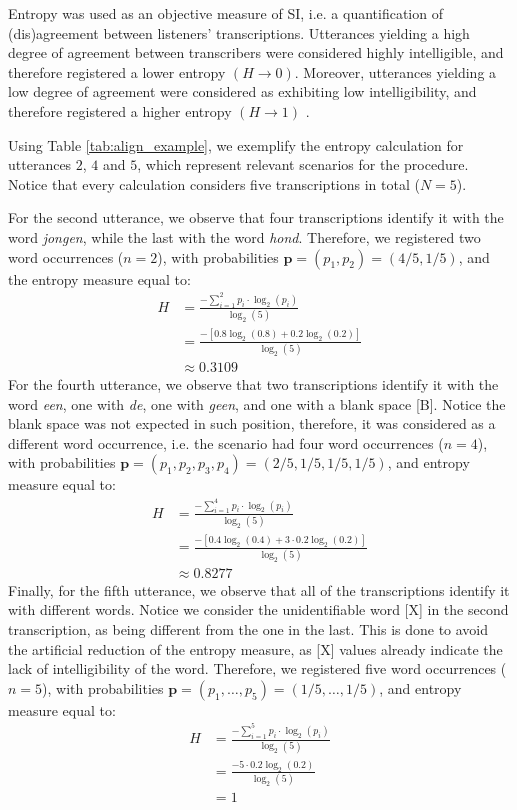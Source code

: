 Entropy was used as an objective measure of SI, i.e. a quantification of (dis)agreement between listeners' transcriptions. Utterances yielding a high degree of agreement between transcribers were considered highly intelligible, and therefore registered a lower entropy $\left( H \rightarrow 0 \right)$. Moreover, utterances yielding a low degree of agreement were considered as exhibiting low intelligibility, and therefore registered a higher entropy $\left( H \rightarrow 1 \right)$ \citep{Boonen_et_al_2021, Faes_et_al_2021}. 

Using Table \ref{tab:align_example}, we exemplify the entropy calculation for utterances $2$, $4$ and $5$, which represent relevant scenarios for the procedure. Notice that every calculation considers five transcriptions in total ($N=5$). 

For the second utterance, we observe that four transcriptions identify it with the word \textit{jongen}, while the last with the word \textit{hond}. Therefore, we registered two word occurrences ($n=2$), with probabilities $\pmb{p} = (p_{1}, p_{2}) = (4/5, 1/5)$, and the entropy measure equal to:
%
\begin{align*}
	H &= \frac{-\sum_{i=1}^{2} p_{i} \cdot \log_{2}(p_{i})}{\log_{2}(5)} \\
	&= \frac{- \left[ 0.8 \log_{2}(0.8) + 0.2 \log_{2}(0.2) \right] }{\log_{2}(5)} \\
	&\approx 0.3109
\end{align*} 
%
For the fourth utterance, we observe that two transcriptions identify it with the word \textit{een}, one with \textit{de}, one with \textit{geen}, and one with a blank space [B]. Notice the blank space was not expected in such position, therefore, it was considered as a different word occurrence, i.e. the scenario had four word occurrences ($n=4$), with probabilities $\pmb{p} = (p_{1}, p_{2}, p_{3}, p_{4}) = (2/5, 1/5, 1/5, 1/5)$, and entropy measure equal to:
%
\begin{align*}
	H &= \frac{-\sum_{i=1}^{4} p_{i} \cdot \log_{2}(p_{i})}{\log_{2}(5)} \\
	&= \frac{- \left[ 0.4 \log_{2}(0.4) + 3 \cdot 0.2 \log_{2}(0.2) \right] }{\log_{2}(5)} \\
	&\approx 0.8277
\end{align*} 
%
Finally, for the fifth utterance, we observe that all of the  transcriptions identify it with different words. Notice we consider the unidentifiable word [X] in the second transcription, as being different from the one in the last. This is done to avoid the artificial reduction of the entropy measure, as [X] values already indicate the lack of intelligibility of the word. Therefore, we registered five word occurrences ($n=5$), with probabilities $\pmb{p} = (p_{1}, \dots, p_{5}) = (1/5, \dots, 1/5)$, and entropy measure equal to:
%
\begin{align*}
	H &= \frac{-\sum_{i=1}^{5} p_{i} \cdot \log_{2}(p_{i})}{\log_{2}(5)} \\
	&= \frac{- 5 \cdot 0.2 \log_{2}(0.2) }{\log_{2}(5)} \\
	&= 1
\end{align*} 
%
%
